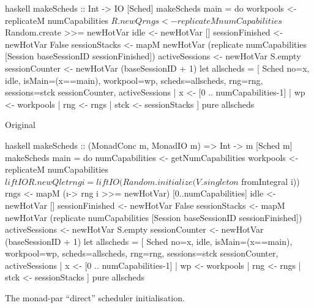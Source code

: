 \begin{listing}
  \begin{sublisting}{\textwidth}
    \centering
    \begin{cminted}{haskell}
makeScheds :: Int -> IO [Sched]
makeScheds main = do
   workpools <- replicateM numCapabilities $ R.newQ
   rngs <- replicateM numCapabilities $ Random.create >>= newHotVar
   idle <- newHotVar []
   sessionFinished <- newHotVar False
   sessionStacks   <- mapM newHotVar
     (replicate numCapabilities [Session baseSessionID sessionFinished])
   activeSessions  <- newHotVar S.empty
   sessionCounter  <- newHotVar (baseSessionID + 1)
   let allscheds = [ Sched { no=x, idle, isMain=(x==main), workpool=wp,
                             scheds=allscheds, rng=rng, sessions=stck
                             sessionCounter, activeSessions
                           }
                   | x   <- [0 .. numCapabilities-1]
                   | wp  <- workpools
                   | rng <- rngs
                   | stck <- sessionStacks
                   ]
   pure allscheds
    \end{cminted}
    \caption{Original}\label{lst:parmonad_orig}
  \end{sublisting}

  \vspace{1.5em}

  \begin{sublisting}{\textwidth}
    \centering
    \begin{cminted}{haskell}
makeScheds :: (MonadConc m, MonadIO m) => Int -> m [Sched m]
makeScheds main = do
   numCapabilities <- getNumCapabilities
   workpools <- replicateM numCapabilities $ liftIO R.newQ
   let rng i = liftIO (Random.initialize (V.singleton $ fromIntegral i))
   rngs <- mapM (\i -> rng i >>= newHotVar) [0..numCapabilities]
   idle <- newHotVar []
   sessionFinished <- newHotVar False
   sessionStacks   <- mapM newHotVar
     (replicate numCapabilities [Session baseSessionID sessionFinished])
   activeSessions  <- newHotVar S.empty
   sessionCounter  <- newHotVar (baseSessionID + 1)
   let allscheds = [ Sched { no=x, idle, isMain=(x==main), workpool=wp,
                             scheds=allscheds, rng=rng, sessions=stck
                             sessionCounter, activeSessions
                           }
                   | x   <- [0 .. numCapabilities-1]
                   | wp  <- workpools
                   | rng <- rngs
                   | stck <- sessionStacks
                   ]
   pure allscheds
    \end{cminted}
    \caption{\dejafu{}}\label{lst:parmonad_dejafu}
  \end{sublisting}
  \caption{The monad-par ``direct'' scheduler initialisation.}\label{lst:parmonad}
\end{listing}

